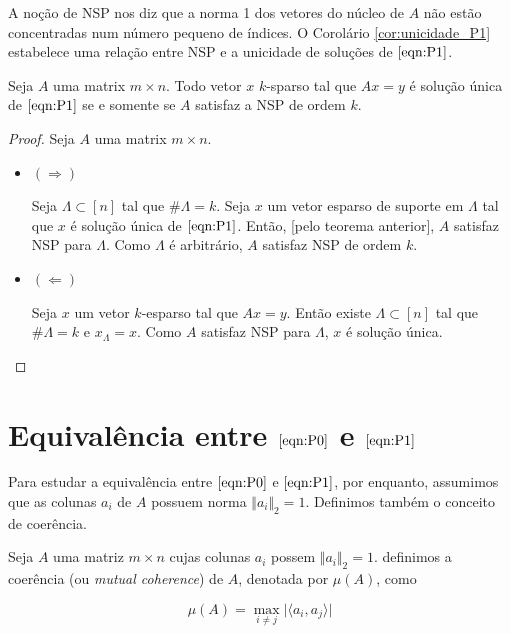 A noção de NSP nos diz que a norma 1 dos vetores do núcleo de $A$ não estão concentradas num número pequeno de índices. O Corolário \ref{cor:unicidade_P1} estabelece uma relação entre NSP e a unicidade de soluções de $\eqref{eqn:P1}$.

\begin{corolario}
\label{cor:unicidade_P1}
Seja $A$ uma matrix $m \times n$. Todo vetor $x$ $k$-sparso tal que $Ax = y$ é solução única de $\eqref{eqn:P1}$ se e somente se $A$ satisfaz a NSP de ordem $k$.
\end{corolario}
\begin{proof}
Seja $A$ uma matrix $m \times n$.
\begin{itemize}

\item $( \Rightarrow )$

Seja $\Lambda \subset [n]$ tal que $\# \Lambda = k$. Seja $x$ um vetor esparso de suporte em $\Lambda$ tal que $x$ é solução única de $\eqref{eqn:P1}$. Então, [pelo teorema anterior], $A$ satisfaz NSP para $\Lambda$. Como $\Lambda$ é arbitrário, $A$ satisfaz NSP de ordem $k$.

\item $( \Leftarrow )$

Seja $x$ um vetor $k$-esparso tal que $Ax = y$. Então existe $\Lambda \subset [n]$ tal que $\# \Lambda = k$ e $x_{\Lambda} = x$. Como $A$ satisfaz NSP para $\Lambda$, $x$ é solução única.
\end{itemize}
\end{proof}

\section{Equivalência entre $\eqref{eqn:P0}$ e $\eqref{eqn:P1}$}
Para estudar a equivalência entre $\eqref{eqn:P0}$ e $\eqref{eqn:P1}$, por enquanto, assumimos que as colunas $a_i$ de $A$ possuem norma $\Vert a_i \Vert_2 = 1$. Definimos também o conceito de coerência.

\begin{definicao}
Seja $A$ uma matriz $m \times n$ cujas colunas $a_i$ possem $\Vert a_i \Vert_2 = 1$. definimos a coerência (ou \textit{mutual coherence}) de $A$, denotada por $\mu(A)$, como


$$\mu(A) = \max_{i \neq j} \vert \langle a_i, a_j \rangle \vert$$
\end{definicao}

